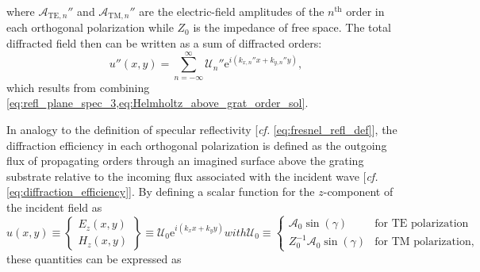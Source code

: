 where $\mathcal{A}_{\text{TE},n}''$ and $\mathcal{A}_{\text{TM},n}''$ are the electric-field amplitudes of the $n^{\text{th}}$ order in each orthogonal polarization while $Z_0$ is the impedance of free space. 
The total diffracted field then can be written as a sum of diffracted orders:
\begin{equation}\label{eq:diff_field_exp}
u'' (x,y) = \sum_{n=-\infty}^{\infty} \mathcal{U}_n'' \mathrm{e}^{i \left( k_{x,n}'' x + k_{y,n}'' y \right)} ,
 \end{equation}
which results from combining \cref{eq:refl_plane_spec_3,eq:Helmholtz_above_grat_order_sol}. 

In analogy to the definition of specular reflectivity [\emph{cf.\@} \cref{eq:fresnel_refl_def}], the diffraction efficiency in each orthogonal polarization is defined as the outgoing flux of propagating orders through an imagined surface above the grating substrate relative to the incoming flux associated with the incident wave [\emph{cf.\@} \cref{eq:diffraction_efficiency}]. 
By defining a scalar function for the $z$-component of the incident field as
\begin{subequations}
\begin{equation}
 u (x,y) \equiv \left\{
 \begin{array}{lr}
  E_z (x,y) \\
  H_z (x,y)
 \end{array}
 \right\} \equiv \mathcal{U}_0 \mathrm{e}^{i \left( k_x x + k_y y \right)}  
\end{equation}
with 
\begin{equation}
 \mathcal{U}_0 \equiv
   \begin{cases}
     \mathcal{A}_0 \sin \left( \gamma \right) & \text{for } \text{TE polarization} \\
     Z_0^{-1} \mathcal{A}_0 \sin \left( \gamma \right) & \text{for } \text{TM polarization,} 
   \end{cases} 
\end{equation}
\end{subequations}
these quantities can be expressed as 
